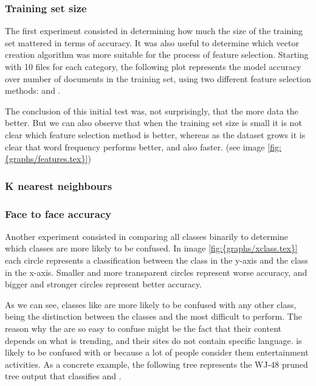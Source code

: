 \subsubsection{Training set size}
The first experiment consisted in determining how much the size of the training set mattered in terms of accuracy. It was also useful to determine which vector creation algorithm was
more suitable for the process of feature selection. Starting with 10 files for each category, the following plot represents the model accuracy over number of documents in the training set, 
using two different feature selection methods:  and .

 
The conclusion of this initial test was, not surprisingly, that the more data the better. But we can also observe that when the training set size is small it is not clear which feature selection 
method is better, whereas as the dataset grows it is clear that word frequency performs better, and also faster. (see image \ref{fig:{graphs/features.tex}})

\subsubsection{K nearest neighbours}

\subsubsection{Face to face accuracy}
Another experiment consisted in comparing all classes binarily to determine which classes are more likely to be confused. In image \ref{fig:{graphs/xclass.tex}} each circle represents a classification 
between the class in the y-axis and the class in the x-axis. Smaller and more transparent circles represent worse accuracy, and bigger and stronger circles represent better accuracy. 

As we can see, classes like  are more likely to be confused with any other class, being the distinction between the classes  and  the most
difficult to perform. The reason why the  are so easy to confuse might be the fact that their content depends on what is trending, and their sites do not contain specific language.
 is likely to be confused with  or  because a lot of people consider them entertainment activities. 
As a concrete example, the following tree represents the WJ-48 pruned tree output that classifies  and .

